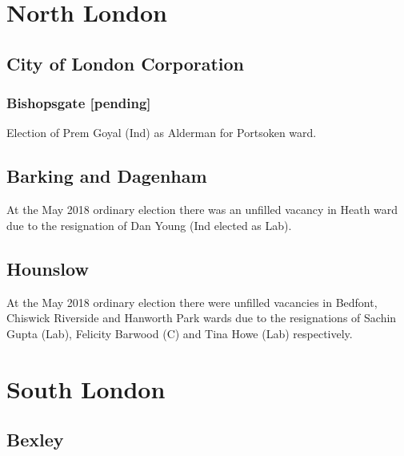 \documentclass[a4paper,openany]{book}
\begin{document}
\begin{resultsiii}
\section{North London}

\subsection*{City of London Corporation}

\subsubsection*{Bishopsgate \hspace*{\fill}\nolinebreak[1]%
\enspace\hspace*{\fill}
[pending]}


Election of Prem Goyal (Ind) as Alderman for Portsoken ward.

\subsection*{Barking and Dagenham}

At the May 2018 ordinary election there was an unfilled vacancy in Heath ward due to the resignation of Dan Young (Ind elected as Lab).

\subsection*{Hounslow}

At the May 2018 ordinary election there were unfilled vacancies in Bedfont, Chiswick Riverside and Hanworth Park wards due to the resignations of Sachin Gupta (Lab), Felicity Barwood (C) and Tina Howe (Lab) respectively.

\section{South London}

\subsection*{Bexley}


\end{resultsiii}
\end{document}
